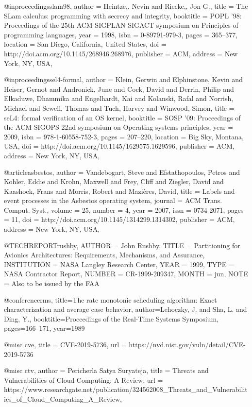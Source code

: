 @inproceedings{slam98,
 author = {Heintze,, Nevin and Riecke,, Jon G.},
 title = {The SLam calculus: programming with secrecy and integrity},
 booktitle = {POPL '98: Proceedings of the 25th ACM SIGPLAN-SIGACT symposium on Principles of programming languages},
 year = {1998},
 isbn = {0-89791-979-3},
 pages = {365--377},
 location = {San Diego, California, United States},
 doi = {http://doi.acm.org/10.1145/268946.268976},
 publisher = {ACM},
 address = {New York, NY, USA},
 }

@inproceedings{sel4-formal,
 author = {Klein, Gerwin and Elphinstone, Kevin and Heiser, Gernot and Andronick, June and Cock, David and Derrin, Philip and Elkaduwe, Dhammika and Engelhardt, Kai and Kolanski, Rafal and Norrish, Michael and Sewell, Thomas and Tuch, Harvey and Winwood, Simon},
 title = {seL4: formal verification of an OS kernel},
 booktitle = {SOSP '09: Proceedings of the ACM SIGOPS 22nd symposium on Operating systems principles},
 year = {2009},
 isbn = {978-1-60558-752-3},
 pages = {207--220},
 location = {Big Sky, Montana, USA},
 doi = {http://doi.acm.org/10.1145/1629575.1629596},
 publisher = {ACM},
 address = {New York, NY, USA},
 }

@article{asbestos,
 author = {Vandebogart, Steve and Efstathopoulos, Petros and Kohler, Eddie and Krohn, Maxwell and Frey, Cliff and Ziegler, David and Kaashoek, Frans and Morris, Robert and Mazi\`{e}res, David},
 title = {Labels and event processes in the Asbestos operating system},
 journal = {ACM Trans. Comput. Syst.},
 volume = {25},
 number = {4},
 year = {2007},
 issn = {0734-2071},
 pages = {11},
 doi = {http://doi.acm.org/10.1145/1314299.1314302},
 publisher = {ACM},
 address = {New York, NY, USA},
 }

@TECHREPORT{rushby,
  AUTHOR = {John Rushby},
  TITLE = {Partitioning for Avionics Architectures:
    Requirements, Mechanisms, and Assurance},
  INSTITUTION = {NASA Langley Research Center},
  YEAR = 1999,
  TYPE = {NASA Contractor Report},
  NUMBER = {CR-1999-209347},
  MONTH = jun,
  NOTE = {Also to be issued by the FAA}
}

@conference{rms,
  title={{The rate monotonic scheduling algorithm: Exact characterization and average case behavior}},
  author={Lehoczky, J. and Sha, L. and Ding, Y.},
  booktitle={Proceedings of the Real-Time Systems Symposium},
  pages={166--171},
  year={1989}
}

@misc {cve,
  title = {CVE-2019-5736},
  url = {https://nvd.nist.gov/vuln/detail/CVE-2019-5736}
}

@misc {ctv,
  author = {Pericherla Satya Suryateja},
  title = {Threats and Vulnerabilities of Cloud Computing: A Review},
  url = {https://www.researchgate.net/publication/324562008_Threats_and_Vulnerabilities_of_Cloud_Computing_A_Review},
}

